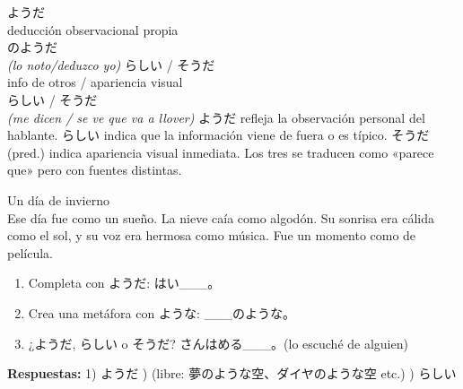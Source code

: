   {ようだ\\\small deducción observacional propia\\\small {}のようだ\\\textit{(lo noto/deduzco yo)}}
  {らしい / そうだ\\\small info de otros / apariencia visual\\\small {}らしい / そうだ\\\textit{(me dicen / se ve que va a llover)}}
  {ようだ refleja la observación personal del hablante. らしい indica que la información viene de fuera o es típico. そうだ (pred.) indica apariencia visual inmediata. Los tres se traducen como «parece que» pero con fuentes distintas.}



{Un día de invierno\\[0.4em]
  Ese día fue como un sueño. La nieve caía como algodón. Su sonrisa era cálida como el sol, y su voz era hermosa como música. Fue un momento como de película.}

\begin{tcolorbox}[ejerciciobox, title={\emoji{pencil} Ejercicios}]
\begin{enumerate}
  \item Completa con ようだ: はい\_\_\_。
  \item Crea una metáfora con ような: \_\_\_のような。
  \item ¿ようだ, らしい o そうだ? さんはめる\_\_\_。(lo escuché de alguien)
\end{enumerate}
\textbf{Respuestas:}
1) ようだ ) (libre: 夢のような空、ダイヤのような空 etc.) ) らしい
\end{tcolorbox}

